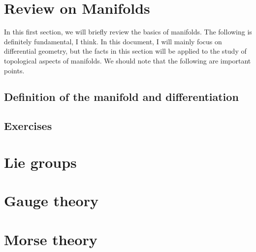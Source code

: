 \documentclass[a4paper,pdftex,10pt]{report}
\begin{document}
\maketitle

\tableofcontents

\clearpage
\chapter{Review on Manifolds}

In this first section, we will briefly review the basics of manifolds. The following is definitely fundamental, I think. In this document, I will mainly focus on differential geometry, but the facts in this section will be applied to the study of topological aspects of manifolds. We should note that the following are important points.

\section{Definition of the manifold and differentiation}







\section{Exercises}









\clearpage
\chapter{Lie groups}









\clearpage
\chapter{Gauge theory}










\clearpage
\chapter{Morse theory}
\end{document}
